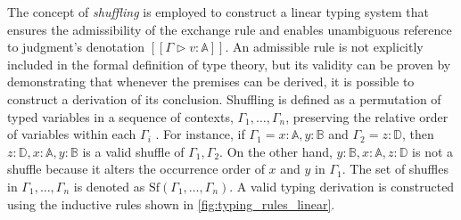 The concept of \emph{shuffling} is employed to construct a linear typing system that ensures the admissibility of the exchange rule and enables unambiguous reference to judgment's denotation $[\![ \Gamma \triangleright v: \mathbb{A} ]\!]$. An admissible rule is not explicitly included in the formal definition of type theory, but its validity can be proven by demonstrating that whenever the premises can be derived, it is possible to construct a derivation of its conclusion. Shuffling is defined as a permutation of typed variables in a sequence of contexts, $\Gamma_1, \ldots, \Gamma_n$, preserving the relative order of variables within each $\Gamma_i$ \cite{shulman2019practical}. For instance, if $\Gamma_1=x:\mathbb{A}, y:\mathbb{B}$ and $\Gamma_2=z:\mathbb{D}$, then $z:\mathbb{D}, x:\mathbb{A}, y:\mathbb{B}$ is a valid shuffle of $\Gamma_1, \Gamma_2$. On the other hand, $y:\mathbb{B}, x:\mathbb{A}, z:\mathbb{D}$ is not a shuffle because it alters the occurrence order of $x$ and $y$ in $\Gamma_1$. The set of shuffles in $\Gamma_1, \ldots, \Gamma_n$ is denoted as $\text{Sf} (\Gamma_1, \ldots, \Gamma_n)$. A valid typing derivation is constructed using the inductive rules shown in \autoref{fig:typing_rules_linear}.
